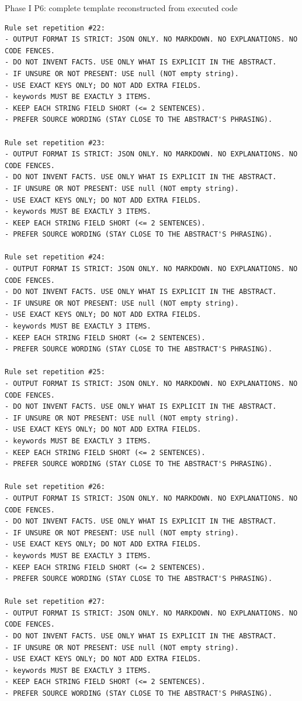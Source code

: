 \documentclass[fleqn,10pt]{wlscirep-authoryear}
\begin{document}
\begin{promptbox}{Phase I P6: complete template reconstructed from executed code}
\begin{lstlisting}[style=promptstyle]
Rule set repetition #22:
- OUTPUT FORMAT IS STRICT: JSON ONLY. NO MARKDOWN. NO EXPLANATIONS. NO CODE FENCES.
- DO NOT INVENT FACTS. USE ONLY WHAT IS EXPLICIT IN THE ABSTRACT.
- IF UNSURE OR NOT PRESENT: USE null (NOT empty string).
- USE EXACT KEYS ONLY; DO NOT ADD EXTRA FIELDS.
- keywords MUST BE EXACTLY 3 ITEMS.
- KEEP EACH STRING FIELD SHORT (<= 2 SENTENCES).
- PREFER SOURCE WORDING (STAY CLOSE TO THE ABSTRACT'S PHRASING).

Rule set repetition #23:
- OUTPUT FORMAT IS STRICT: JSON ONLY. NO MARKDOWN. NO EXPLANATIONS. NO CODE FENCES.
- DO NOT INVENT FACTS. USE ONLY WHAT IS EXPLICIT IN THE ABSTRACT.
- IF UNSURE OR NOT PRESENT: USE null (NOT empty string).
- USE EXACT KEYS ONLY; DO NOT ADD EXTRA FIELDS.
- keywords MUST BE EXACTLY 3 ITEMS.
- KEEP EACH STRING FIELD SHORT (<= 2 SENTENCES).
- PREFER SOURCE WORDING (STAY CLOSE TO THE ABSTRACT'S PHRASING).

Rule set repetition #24:
- OUTPUT FORMAT IS STRICT: JSON ONLY. NO MARKDOWN. NO EXPLANATIONS. NO CODE FENCES.
- DO NOT INVENT FACTS. USE ONLY WHAT IS EXPLICIT IN THE ABSTRACT.
- IF UNSURE OR NOT PRESENT: USE null (NOT empty string).
- USE EXACT KEYS ONLY; DO NOT ADD EXTRA FIELDS.
- keywords MUST BE EXACTLY 3 ITEMS.
- KEEP EACH STRING FIELD SHORT (<= 2 SENTENCES).
- PREFER SOURCE WORDING (STAY CLOSE TO THE ABSTRACT'S PHRASING).

Rule set repetition #25:
- OUTPUT FORMAT IS STRICT: JSON ONLY. NO MARKDOWN. NO EXPLANATIONS. NO CODE FENCES.
- DO NOT INVENT FACTS. USE ONLY WHAT IS EXPLICIT IN THE ABSTRACT.
- IF UNSURE OR NOT PRESENT: USE null (NOT empty string).
- USE EXACT KEYS ONLY; DO NOT ADD EXTRA FIELDS.
- keywords MUST BE EXACTLY 3 ITEMS.
- KEEP EACH STRING FIELD SHORT (<= 2 SENTENCES).
- PREFER SOURCE WORDING (STAY CLOSE TO THE ABSTRACT'S PHRASING).

Rule set repetition #26:
- OUTPUT FORMAT IS STRICT: JSON ONLY. NO MARKDOWN. NO EXPLANATIONS. NO CODE FENCES.
- DO NOT INVENT FACTS. USE ONLY WHAT IS EXPLICIT IN THE ABSTRACT.
- IF UNSURE OR NOT PRESENT: USE null (NOT empty string).
- USE EXACT KEYS ONLY; DO NOT ADD EXTRA FIELDS.
- keywords MUST BE EXACTLY 3 ITEMS.
- KEEP EACH STRING FIELD SHORT (<= 2 SENTENCES).
- PREFER SOURCE WORDING (STAY CLOSE TO THE ABSTRACT'S PHRASING).

Rule set repetition #27:
- OUTPUT FORMAT IS STRICT: JSON ONLY. NO MARKDOWN. NO EXPLANATIONS. NO CODE FENCES.
- DO NOT INVENT FACTS. USE ONLY WHAT IS EXPLICIT IN THE ABSTRACT.
- IF UNSURE OR NOT PRESENT: USE null (NOT empty string).
- USE EXACT KEYS ONLY; DO NOT ADD EXTRA FIELDS.
- keywords MUST BE EXACTLY 3 ITEMS.
- KEEP EACH STRING FIELD SHORT (<= 2 SENTENCES).
- PREFER SOURCE WORDING (STAY CLOSE TO THE ABSTRACT'S PHRASING).


\end{lstlisting}
\end{promptbox}
\end{document}
